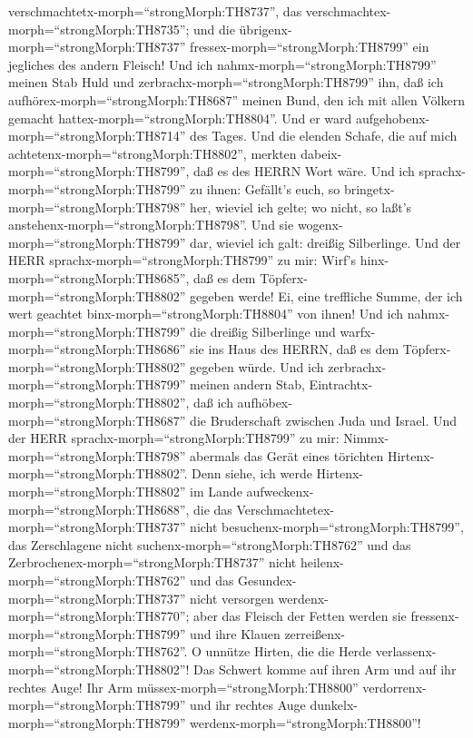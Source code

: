 verschmachtetx-morph=``strongMorph:TH8737'', das
verschmachtex-morph=``strongMorph:TH8735''; und die
übrigenx-morph=``strongMorph:TH8737''
fressex-morph=``strongMorph:TH8799'' ein jegliches des andern Fleisch!
 Und ich nahmx-morph=``strongMorph:TH8799'' meinen Stab
Huld und zerbrachx-morph=``strongMorph:TH8799'' ihn, daß ich
aufhörex-morph=``strongMorph:TH8687'' meinen Bund, den ich mit allen
Völkern gemacht hattex-morph=``strongMorph:TH8804''.  Und
er ward aufgehobenx-morph=``strongMorph:TH8714'' des Tages. Und die
elenden Schafe, die auf mich achtetenx-morph=``strongMorph:TH8802'',
merkten dabeix-morph=``strongMorph:TH8799'', daß es des HERRN Wort wäre.
 Und ich sprachx-morph=``strongMorph:TH8799'' zu ihnen:
Gefällt's euch, so bringetx-morph=``strongMorph:TH8798'' her, wieviel
ich gelte; wo nicht, so laßt's anstehenx-morph=``strongMorph:TH8798''.
Und sie wogenx-morph=``strongMorph:TH8799'' dar, wieviel ich galt:
dreißig Silberlinge.  Und der HERR
sprachx-morph=``strongMorph:TH8799'' zu mir: Wirf's
hinx-morph=``strongMorph:TH8685'', daß es dem
Töpferx-morph=``strongMorph:TH8802'' gegeben werde! Ei, eine treffliche
Summe, der ich wert geachtet binx-morph=``strongMorph:TH8804'' von
ihnen! Und ich nahmx-morph=``strongMorph:TH8799'' die dreißig
Silberlinge und warfx-morph=``strongMorph:TH8686'' sie ins Haus des
HERRN, daß es dem Töpferx-morph=``strongMorph:TH8802'' gegeben würde.
 Und ich zerbrachx-morph=``strongMorph:TH8799'' meinen
andern Stab, Eintrachtx-morph=``strongMorph:TH8802'', daß ich
aufhöbex-morph=``strongMorph:TH8687'' die Bruderschaft zwischen Juda und
Israel.  Und der HERR sprachx-morph=``strongMorph:TH8799''
zu mir: Nimmx-morph=``strongMorph:TH8798'' abermals das Gerät eines
törichten Hirtenx-morph=``strongMorph:TH8802''.  Denn
siehe, ich werde Hirtenx-morph=``strongMorph:TH8802'' im Lande
aufweckenx-morph=``strongMorph:TH8688'', die das
Verschmachtetex-morph=``strongMorph:TH8737'' nicht
besuchenx-morph=``strongMorph:TH8799'', das Zerschlagene nicht
suchenx-morph=``strongMorph:TH8762'' und das
Zerbrochenex-morph=``strongMorph:TH8737'' nicht
heilenx-morph=``strongMorph:TH8762'' und das
Gesundex-morph=``strongMorph:TH8737'' nicht versorgen
werdenx-morph=``strongMorph:TH8770''; aber das Fleisch der Fetten werden
sie fressenx-morph=``strongMorph:TH8799'' und ihre Klauen
zerreißenx-morph=``strongMorph:TH8762''.  O unnütze Hirten,
die die Herde verlassenx-morph=``strongMorph:TH8802''! Das Schwert komme
auf ihren Arm und auf ihr rechtes Auge! Ihr Arm
müssex-morph=``strongMorph:TH8800''
verdorrenx-morph=``strongMorph:TH8799'' und ihr rechtes Auge
dunkelx-morph=``strongMorph:TH8799''
werdenx-morph=``strongMorph:TH8800''!

